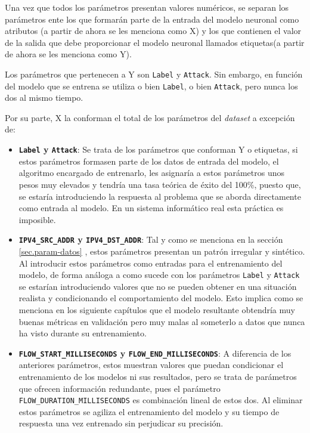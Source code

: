 Una vez que todos los parámetros presentan valores numéricos, se separan los parámetros ente los que formarán parte de la entrada del modelo neuronal como atributos (a partir de ahora se les menciona como X) y los que contienen el valor de la salida que debe proporcionar el modelo neuronal llamados etiquetas(a partir de ahora se les menciona como Y).

Los parámetros que pertenecen a Y son \texttt{Label} y \texttt{Attack}. Sin embargo, en función del modelo que se entrena se utiliza o bien \texttt{Label}, o bien \texttt{Attack}, pero nunca los dos al mismo tiempo.

Por su parte, X la conforman el total de los parámetros del \textit{dataset} a excepción de:
\begin{itemize}
	\item \textbf{\texttt{Label} y \texttt{Attack}}: Se trata de los parámetros que conforman Y o etiquetas, si estos parámetros formasen parte de los datos de entrada del modelo, el algoritmo encargado de entrenarlo, les asignaría a estos parámetros unos pesos muy elevados y tendría una tasa teórica de éxito del 100\%, puesto que, se estaría introduciendo la respuesta al problema que se aborda directamente como entrada al modelo. En un sistema informático real esta práctica es imposible.
	\item \textbf{\texttt{IPV4\_SRC\_ADDR} y \texttt{IPV4\_DST\_ADDR}}: Tal y como se menciona en la sección \ref{sec.param-datos} , estos parámetros presentan un patrón irregular y sintético. Al introducir estos parámetros como entradas para el entrenamiento del modelo, de forma análoga a como sucede con los parámetros \texttt{Label} y \texttt{Attack} se estarían introduciendo valores que no se pueden obtener en una situación realista y condicionando el comportamiento del modelo. Esto implica como se menciona en los siguiente capítulos que el modelo resultante obtendría muy buenas métricas en validación pero muy malas al someterlo a datos que nunca ha visto durante su entrenamiento.
	\item \textbf{\texttt{FLOW\_START\_MILLISECONDS} y \texttt{FLOW\_END\_MILLISECONDS}}: A diferencia de los anteriores parámetros, estos muestran valores que puedan condicionar el entrenamiento de los modelos ni sus resultados, pero se trata de parámetros que ofrecen información redundante, pues el parámetro \texttt{FLOW\_DURATION\_MILLISECONDS} es combinación lineal de estos dos. Al eliminar estos parámetros se agiliza el entrenamiento del modelo y su tiempo de respuesta una vez entrenado sin perjudicar su precisión.
\end{itemize}


